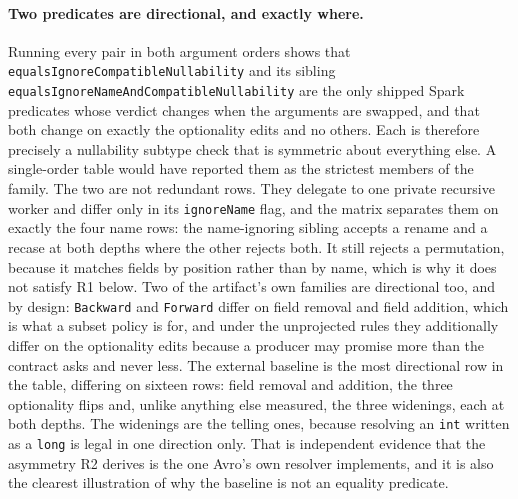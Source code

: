 \paragraph{Two predicates are directional, and exactly where.} Running every pair in both argument orders shows that \texttt{equals\allowbreak Ignore\allowbreak Compatible\allowbreak Nullability} and its sibling \texttt{equals\allowbreak Ignore\allowbreak Name\allowbreak And\allowbreak Compatible\allowbreak Nullability} are the only shipped Spark predicates whose verdict changes when the arguments are swapped, and that both change on exactly the optionality edits and no others. Each is therefore precisely a nullability subtype check that is symmetric about everything else. A single-order table would have reported them as the strictest members of the family. The two are not redundant rows. They delegate to one private recursive worker and differ only in its \texttt{ignoreName} flag, and the matrix separates them on exactly the four name rows: the name-ignoring sibling accepts a rename and a recase at both depths where the other rejects both. It still rejects a permutation, because it matches fields by position rather than by name, which is why it does not satisfy R1 below. Two of the artifact's own families are directional too, and by design: \texttt{Backward} and \texttt{Forward} differ on field removal and field addition, which is what a subset policy is for, and under the unprojected rules they additionally differ on the optionality edits because a producer may promise more than the contract asks and never less. The external baseline is the most directional row in the table, differing on sixteen rows: field removal and addition, the three optionality flips and, unlike anything else measured, the three widenings, each at both depths. The widenings are the telling ones, because resolving an \texttt{int} written as a \texttt{long} is legal in one direction only. That is independent evidence that the asymmetry R2 derives is the one Avro's own resolver implements, and it is also the clearest illustration of why the baseline is not an equality predicate.

